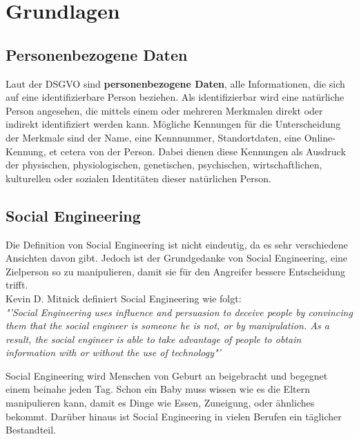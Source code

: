 
\chapter {Grundlagen}  %
\label{cha:grundlagen} %

\section{Personenbezogene Daten}
Laut der DSGVO sind \textbf{personenbezogene Daten}, alle Informationen, die sich auf eine identifizierbare Person beziehen. Als identifizierbar wird eine natürliche Person angesehen, die mittels einem oder mehreren Merkmalen direkt oder indirekt identifiziert werden kann. Mögliche Kennungen für die Unterscheidung der Merkmale sind der Name, eine Kennnummer, Standortdaten, eine Online-Kennung, et cetera von der Person. Dabei dienen diese Kennungen als Ausdruck der physischen, physiologischen, genetischen, psychischen, wirtschaftlichen, kulturellen oder sozialen Identitäten dieser natürlichen Person. \cite{personenbezogeneDaten}

\section{Social Engineering} %
\label {sec:Social Engineering} %
	Die Definition von Social Engineering ist nicht eindeutig, da es sehr verschiedene Ansichten davon gibt. Jedoch ist der Grundgedanke von Social Engineering, eine Zielperson so zu manipulieren, damit sie für den Angreifer bessere Entscheidung trifft. \cite{ArtOfHumanHacking} \\
	Kevin D. Mitnick definiert Social Engineering wie folgt:\\	
	\textit{"'Social Engineering uses influence and persuasion to deceive people by convincing them that the social engineer is someone he is not, or by manipulation. As a result, the social engineer is able to take advantage of people to obtain information with or without the use of technology"'}\cite{ArtOfDeception}
	
	Social Engineering wird Menschen von Geburt an beigebracht und begegnet einem beinahe jeden Tag. Schon ein Baby muss wissen wie es die Eltern manipulieren kann, damit es Dinge wie Essen, Zuneigung, oder ähnliches bekommt. Darüber hinaus ist Social Engineering in vielen Berufen ein täglicher Bestandteil. %
	
